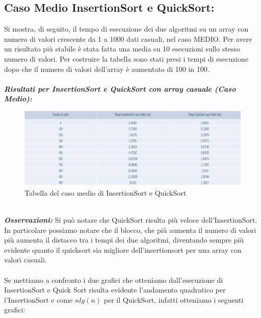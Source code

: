 \documentclass{article}
\begin{document}
\subsection {Caso Medio InsertionSort e QuickSort:} 
Si mostra, di seguito, il tempo di esecuzione dei due algoritmi su un array con numero di valori crescente da 1 a 1000 dati casuali, nel caso MEDIO. Per avere un risultato più stabile è stata fatta una media su 10 esecuzioni sullo stesso numero di valori. Per costruire la tabella sono stati presi i tempi di esecuzione dopo che il numero di valori dell'array è aumentato di 100 in 100. \\
\\
\textit{\bf{Risultati per InsertionSort e QuickSort con array casuale (Caso Medio):}} \\
\begin{figure}[h]
\centering
\includegraphics[width=\textwidth]{CasoMedioTabella}
\vspace{-5mm}
\caption{Tabella del caso medio di InsertionSort e QuickSort}
\label{fig:fig1}
\end{figure} \\

\noindent \textit{\bf{Osservazioni:}}
\newline
Si può notare che QuickSort risulta più veloce dell'InsertionSort. \\
In particolare possiamo notare che il blocco, che più aumenta il numero di valori più aumenta il distacco tra i tempi dei due algoritmi, diventando sempre più evidente quanto il quicksort sia migliore dell'insertionsort per una array con valori casuali. \\
\\
Se mettiamo a confronto i due grafici che otteniamo dall'esecuzione di InsertionSort e Quick Sort risulta evidente l'andamento quadratico per l'InsertionSort e come $nlg(n)$ per il QuickSort, infatti otteniamo i seguenti grafici: \\
\end{document}

